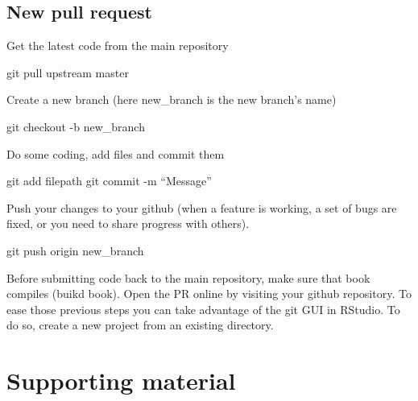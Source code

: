 \documentclass[
  12pt,
  oneside]{book}
\newenvironment{Shaded}{\begin{snugshade}}{\end{snugshade}}
\newcommand{\AttributeTok}[1]{\textcolor[rgb]{0.77,0.63,0.00}{#1}}
\newcommand{\FunctionTok}[1]{\textcolor[rgb]{0.00,0.00,0.00}{#1}}
\newcommand{\NormalTok}[1]{#1}
\begin{document}
\hypertarget{new-pull-request}{%
\section*{New pull request}\label{new-pull-request}}

Get the latest code from the main repository

\begin{Shaded}
\begin{Highlighting}[]
\FunctionTok{git}\NormalTok{ pull upstream master}
\end{Highlighting}
\end{Shaded}

Create a new branch (here new\_branch is the new branch's name)

\begin{Shaded}
\begin{Highlighting}[]
\FunctionTok{git}\NormalTok{ checkout }\AttributeTok{{-}b}\NormalTok{ new\_branch}
\end{Highlighting}
\end{Shaded}

Do some coding, add files and commit them

\begin{Shaded}
\begin{Highlighting}[]
\FunctionTok{git}\NormalTok{ add filepath}
\FunctionTok{git}\NormalTok{ commit }\AttributeTok{{-}m}\NormalTok{ “Message”}
\end{Highlighting}
\end{Shaded}

Push your changes to your github (when a feature is working, a set of bugs are fixed, or you need to share progress with others).

\begin{Shaded}
\begin{Highlighting}[]
\FunctionTok{git}\NormalTok{ push origin new\_branch}
\end{Highlighting}
\end{Shaded}

Before submitting code back to the main repository, make sure that book compiles (buikd book). Open the PR online by visiting your github repository. To ease those previous steps you can take advantage of the git GUI in RStudio. To do so, create a new project from an existing directory.

\hypertarget{supporting-material}{%
\chapter*{Supporting material}\label{supporting-material}}
\end{document}
